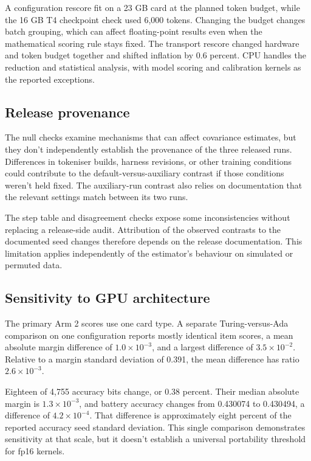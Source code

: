 A configuration rescore fit on a 23 GB card at the planned token budget, while the 16 GB T4 checkpoint check used 6,000 tokens. Changing the budget changes batch grouping, which can affect floating-point results even when the mathematical scoring rule stays fixed. The transport rescore changed hardware and token budget together and shifted inflation by 0.6 percent. CPU handles the reduction and statistical analysis, with model scoring and calibration kernels as the reported exceptions.

\subsection{Release provenance}
The null checks examine mechanisms that can affect covariance estimates, but they don't independently establish the provenance of the three released runs. Differences in tokeniser builds, harness revisions, or other training conditions could contribute to the default-versus-auxiliary contrast if those conditions weren't held fixed. The auxiliary-run contrast also relies on documentation that the relevant settings match between its two runs.

The step table and disagreement checks expose some inconsistencies without replacing a release-side audit. Attribution of the observed contrasts to the documented seed changes therefore depends on the release documentation. This limitation applies independently of the estimator's behaviour on simulated or permuted data.

\subsection{Sensitivity to GPU architecture}
The primary Arm 2 scores use one card type. A separate Turing-versus-Ada comparison on one configuration reports mostly identical item scores, a mean absolute margin difference of $1.0\times10^{-3}$, and a largest difference of $3.5\times10^{-2}$. Relative to a margin standard deviation of 0.391, the mean difference has ratio $2.6\times10^{-3}$.

Eighteen of 4,755 accuracy bits change, or 0.38 percent. Their median absolute margin is $1.3\times10^{-3}$, and battery accuracy changes from 0.430074 to 0.430494, a difference of $4.2\times10^{-4}$. That difference is approximately eight percent of the reported accuracy seed standard deviation. This single comparison demonstrates sensitivity at that scale, but it doesn't establish a universal portability threshold for fp16 kernels.

